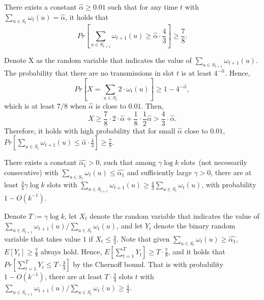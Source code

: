 \begin{lemma}
    \label{lemma10}
    There exists a constant $\hat{\alpha} \geq 0.01$ such that
    for any time $t$ with ${\sum}_{u\in S_t}\omega_t(u)=\hat{\alpha}$,
    it holds that
    \begin{equation}
        Pr[{\sum}_{u\in S_{t+1}}\omega_{t+1}(u) \geq \hat{\alpha}\cdot \frac{4}{3}] \geq \frac{7}{8}.
    \end{equation}
\end{lemma}

\begin{IEEEproof}
    Denote X as the random variable that indicates the value of 
    ${\sum}_{u\in S_{t+1}}\omega_{t+1}(u)$. The probability that 
    there are no transmissions in slot 
    $t$ is at least $4^{-\hat{\alpha}}$. Hence,
    \begin{equation*}
        Pr[X ={\sum}_{u\in S_t}2\cdot\omega_t(u)] 
        \geq 1 - 4^{-\hat{\alpha}},
    \end{equation*}
    which is at least $7/8$ when $\hat{\alpha}$ is close to $0.01$. Then,
    \begin{equation*}
        X \geq \frac{7}{8}\cdot 2\cdot\hat{\alpha} + 
        \frac{1}{8}\cdot \frac{1}{2}\hat{\alpha} 
        > \frac{4}{3}\cdot\hat{\alpha}.
    \end{equation*}
    Therefore, it holds with high probability that for small $\hat{\alpha}$ close to $0.01$, $Pr[{\sum}_{u\in S_t}\omega_{t+1}(u) 
    \leq \hat{\alpha}\cdot\frac{4}{3}] \geq \frac{7}{8}$.
\end{IEEEproof}

\begin{lemma}
    \label{lemma11}
    There exists a constant $\hat{\alpha_1} > 0$, such that among $\gamma\log k$ 
    slots~(not necessarily consecutive) with ${\sum}_{u\in S_t}\omega_t(u)
    \leq \hat{\alpha_1}$ and sufficiently large $\gamma > 0$, there are at 
    least $\frac{3}{4}\gamma\log k$ slots with ${\sum}_{u\in S_{t+1}}\omega_{t+1}(u)
    \geq \frac{4}{3}{\sum}_{u\in S_t}\omega_t(u)$, with probability $1 - O(k^{-1})$.
\end{lemma}

\begin{IEEEproof}
    Denote $T := \gamma\log k$, let $X_t$ denote the random variable that indicates the value of 
    ${\sum}_{u\in S_{t+1}}\omega_{t+1}(u) / {\sum}_{u\in S_t}\omega_t(u)$, and let
    $Y_t$ denote the binary random variable that takes value $1$ if $X_t \leq \frac{4}{3}$.
    Note that given ${\sum}_{u\in S_t}\omega_t(u) \geq \hat{\alpha_1}$, $E[Y_t] \geq \frac{7}{8}$
    always hold. Hence, $E[\sum_{t=1}^{T}Y_t] \geq T\cdot\frac{7}{8}$, and it holds that
    $Pr[\sum_{t=1}^{T}Y_t\leq T\cdot\frac{3}{4}]$ by the Chernoff bound. That is with probability 
    $1-O(k^{-1})$, there are at least $T\cdot\frac{3}{4}$ slots $t$ with  
    ${\sum}_{u\in S_{t+1}}\omega_{t+1}(u) / {\sum}_{u\in S_t}\omega_t(u) \geq \frac{4}{3}$.
\end{IEEEproof}

